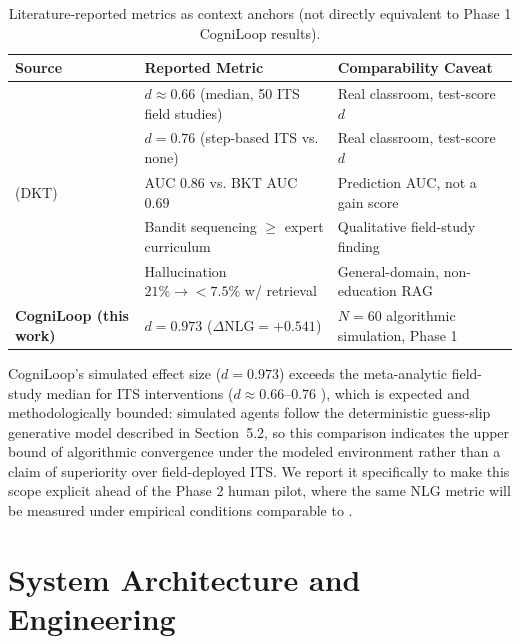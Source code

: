 \documentclass[notitlepage,12pt]{jedm}
\begin{document}
\begin{table}
\caption{Literature-reported metrics as context anchors (not directly equivalent to Phase 1 CogniLoop results).}
\label{table_lit}
\centering
\small
\renewcommand{\arraystretch}{1.3}
\setlength{\tabcolsep}{6pt}
\begin{tabular}{|p{3.0cm}|p{4.5cm}|p{4.2cm}|}
\hline
\textbf{Source} & \textbf{Reported Metric} & \textbf{Comparability Caveat} \\
\hline
\cite{kulik2016effectiveness} & $d \approx 0.66$ (median, 50 ITS field studies) & Real classroom, test-score $d$ \\
\hline
\cite{vanlehn2011relative} & $d = 0.76$ (step-based ITS vs. none) & Real classroom, test-score $d$ \\
\hline
\cite{piech2015deep} (DKT) & AUC $0.86$ vs. BKT AUC $0.69$ & Prediction AUC, not a gain score \\
\hline
\cite{clement2015multi} & Bandit sequencing $\geq$ expert curriculum & Qualitative field-study finding \\
\hline
\cite{niu2024reducing} & Hallucination $21\% \rightarrow <7.5\%$ w/ retrieval & General-domain, non-education RAG \\
\hline
\textbf{CogniLoop (this work)} & $d = 0.973$ ($\Delta\text{NLG}=+0.541$) & $N=60$ algorithmic simulation, Phase 1 \\
\hline
\end{tabular}
\renewcommand{\arraystretch}{1.0}
\end{table}

CogniLoop's simulated effect size ($d=0.973$) exceeds the meta-analytic field-study median for ITS interventions ($d \approx 0.66$--$0.76$ \cite{kulik2016effectiveness,vanlehn2011relative}), which is expected and methodologically bounded: simulated agents follow the deterministic guess-slip generative model described in Section~5.2, so this comparison indicates the upper bound of algorithmic convergence under the modeled environment rather than a claim of superiority over field-deployed ITS. We report it specifically to make this scope explicit ahead of the Phase 2 human pilot, where the same NLG metric will be measured under empirical conditions comparable to \cite{kulik2016effectiveness,vanlehn2011relative}.

\section{System Architecture and Engineering}
\end{document}
